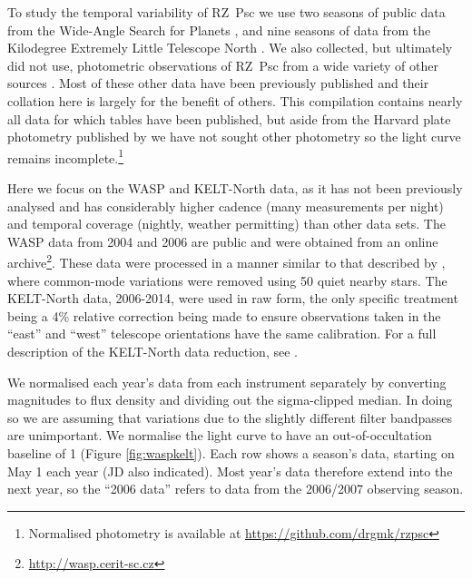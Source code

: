 \documentclass[useAMS,usenatbib,usegraphicx]{mn2e}
\begin{document}
To study the temporal variability of RZ~Psc we use two seasons of public data from the
Wide-Angle Search for Planets \citep[WASP,][]{2006PASP..118.1407P}, and nine seasons of
data from the Kilodegree Extremely Little Telescope North
\citep[KELT-North,][]{2007PASP..119..923P}. We also collected, but ultimately did not
use, photometric observations of RZ~Psc from a wide variety of other sources \citep[][,
the Catalina Sky Survey, the American Association of Variable Star Observers, the All-Sky
Automated
Survey]{1994AJ....108.1906H,1973IBVS..783....1K,1980PZ.....21..310K,1985PZ.....22..181Z,1991Afz....34..333K,1997AcA....47..467P,2014Ap.....57..491P}. Most
of these other data have been previously published and their collation here is largely
for the benefit of others. This compilation contains nearly all data for which tables
have been published, but aside from the Harvard plate photometry published by
\citet{1999A&AS..140..293G} we have not sought other photometry so the light curve
remains incomplete.\footnote{Normalised photometry is available at
  \href{https://github.com/drgmk/rzpsc}{https://github.com/drgmk/rzpsc}}

Here we focus on the WASP and KELT-North data, as it has not been previously analysed and
has considerably higher cadence (many measurements per night) and temporal coverage
(nightly, weather permitting) than other data sets. The WASP data from 2004 and 2006 are
public and were obtained from an online
archive\footnote{\href{http://wasp.cerit-sc.cz}{http://wasp.cerit-sc.cz}}. These data
were processed in a manner similar to that described by \citet{2014MNRAS.441.2845V},
where common-mode variations were removed using 50 quiet nearby stars. The KELT-North
data, 2006-2014, were used in raw form, the only specific treatment being a 4\% relative
correction being made to ensure observations taken in the ``east'' and ``west'' telescope
orientations have the same calibration. For a full description of the KELT-North data
reduction, see \citet{2012ApJ...761..123S}.

We normalised each year's data from each instrument separately by converting magnitudes
to flux density and dividing out the sigma-clipped median. In doing so we are assuming
that variations due to the slightly different filter bandpasses are unimportant. We
normalise the light curve to have an out-of-occultation baseline of 1 (Figure
\ref{fig:waspkelt}). Each row shows a season's data, starting on May 1 each year (JD also
indicated). Most year's data therefore extend into the next year, so the ``2006 data''
refers to data from the 2006/2007 observing season.
\end{document}
